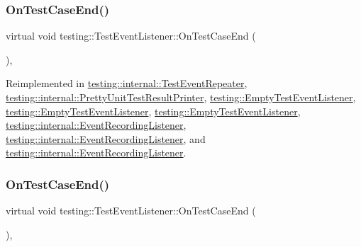 \subsubsection{\texorpdfstring{OnTestCaseEnd()}{OnTestCaseEnd()}\hspace{0.1cm}{\footnotesize\ttfamily [2/3]}}
{\footnotesize\ttfamily virtual void testing\+::\+Test\+Event\+Listener\+::\+On\+Test\+Case\+End (\begin{DoxyParamCaption}\item[{const \mbox{\hyperlink{classtesting_1_1_test_case}{Test\+Case}} \&}]{ }\end{DoxyParamCaption})\hspace{0.3cm}{\ttfamily [inline]}, {\ttfamily [virtual]}}



Reimplemented in \mbox{\hyperlink{classtesting_1_1internal_1_1_test_event_repeater_a0a335e1c3957a8c699ed56e37ea7b978}{testing\+::internal\+::\+Test\+Event\+Repeater}}, \mbox{\hyperlink{classtesting_1_1internal_1_1_pretty_unit_test_result_printer_a7a62fe58fa6f6aace813eb62b31e5a51}{testing\+::internal\+::\+Pretty\+Unit\+Test\+Result\+Printer}}, \mbox{\hyperlink{classtesting_1_1_empty_test_event_listener_abe05cc74c1081ed51e2c84b73013299e}{testing\+::\+Empty\+Test\+Event\+Listener}}, \mbox{\hyperlink{classtesting_1_1_empty_test_event_listener_abe05cc74c1081ed51e2c84b73013299e}{testing\+::\+Empty\+Test\+Event\+Listener}}, \mbox{\hyperlink{classtesting_1_1_empty_test_event_listener_a6bec703158283104c4298f7d8a528515}{testing\+::\+Empty\+Test\+Event\+Listener}}, \mbox{\hyperlink{classtesting_1_1internal_1_1_event_recording_listener_a52788314427f5c7a4585ea0bf5f3c251}{testing\+::internal\+::\+Event\+Recording\+Listener}}, \mbox{\hyperlink{classtesting_1_1internal_1_1_event_recording_listener_a52788314427f5c7a4585ea0bf5f3c251}{testing\+::internal\+::\+Event\+Recording\+Listener}}, and \mbox{\hyperlink{classtesting_1_1internal_1_1_event_recording_listener_a4d0cb8a389c7339bce0aa6128291529f}{testing\+::internal\+::\+Event\+Recording\+Listener}}.

\mbox{\label{classtesting_1_1_test_event_listener_a6cada1572dde8010b94f6dd237ce52f4}} 
\subsubsection{\texorpdfstring{OnTestCaseEnd()}{OnTestCaseEnd()}\hspace{0.1cm}{\footnotesize\ttfamily [3/3]}}
{\footnotesize\ttfamily virtual void testing\+::\+Test\+Event\+Listener\+::\+On\+Test\+Case\+End (\begin{DoxyParamCaption}\item[{const \mbox{\hyperlink{classtesting_1_1_test_case}{Test\+Case}} \&}]{ }\end{DoxyParamCaption})\hspace{0.3cm}{\ttfamily [inline]}, {\ttfamily [virtual]}}



